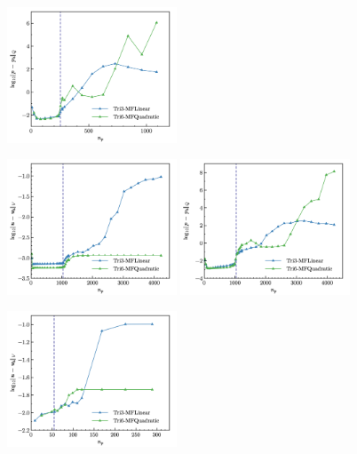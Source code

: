 \begin{figure}[H]
\begin{subcaptiongroup}
    \label{hole_8_L2_u}
    \includegraphics[width=0.45\textwidth]{figures/ch_4/plate_with_hole_8_L2_p.png}
    \label{hole_8_L2_p}
    \end{subcaptiongroup}
    \begin{subcaptiongroup}
    \includegraphics[width=0.45\textwidth]{figures/ch_4/plate_with_hole_16_L2_u.png}
    \label{hole_16_L2_u}
    \includegraphics[width=0.45\textwidth]{figures/ch_4/plate_with_hole_16_L2_p.png}
    \label{hole_16_L2_p}
    \end{subcaptiongroup}
    \begin{subcaptiongroup}
    \includegraphics[width=0.45\textwidth]{figures/ch_4/plate_with_hole_4_L2_u.png}

\end{subcaptiongroup}
\end{figure}

